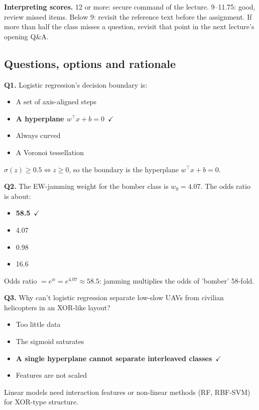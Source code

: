 \documentclass[11pt]{article}
\begin{document}
\textbf{Interpreting scores.} 12 or more: secure command of the lecture. 9--11.75: good, review missed items. Below 9: revisit the reference text before the assignment. If more than half the class misses a question, revisit that point in the next lecture's opening Q\&A.

\subsection*{Questions, options and rationale}

{\small

\noindent\textbf{Q1.} Logistic regression's decision boundary is:\begin{itemize}[leftmargin=2.2em,itemsep=0pt,topsep=1pt]\item[A.] A set of axis-aligned steps\item[\textbf{B.}] \textbf{A hyperplane $w^\top x+b=0$}~{\color{GrnN}$\checkmark$}\item[C.] Always curved\item[D.] A Voronoi tessellation\end{itemize} $\sigma(z)\ge0.5\iff z\ge0$, so the boundary is the hyperplane $w^\top x+b=0$.\par\medskip

\noindent\textbf{Q2.} The EW-jamming weight for the bomber class is $w_9=4.07$. The odds ratio is about:\begin{itemize}[leftmargin=2.2em,itemsep=0pt,topsep=1pt]\item[\textbf{A.}] \textbf{58.5}~{\color{GrnN}$\checkmark$}\item[B.] 4.07\item[C.] 0.98\item[D.] 16.6\end{itemize} Odds ratio $=e^{w}=e^{4.07}\approx58.5$: jamming multiplies the odds of 'bomber' 58-fold.\par\medskip

\noindent\textbf{Q3.} Why can't logistic regression separate low-slow UAVs from civilian helicopters in an XOR-like layout?\begin{itemize}[leftmargin=2.2em,itemsep=0pt,topsep=1pt]\item[A.] Too little data\item[B.] The sigmoid saturates\item[\textbf{C.}] \textbf{A single hyperplane cannot separate interleaved classes}~{\color{GrnN}$\checkmark$}\item[D.] Features are not scaled\end{itemize} Linear models need interaction features or non-linear methods (RF, RBF-SVM) for XOR-type structure.\par\medskip

}
\end{document}

